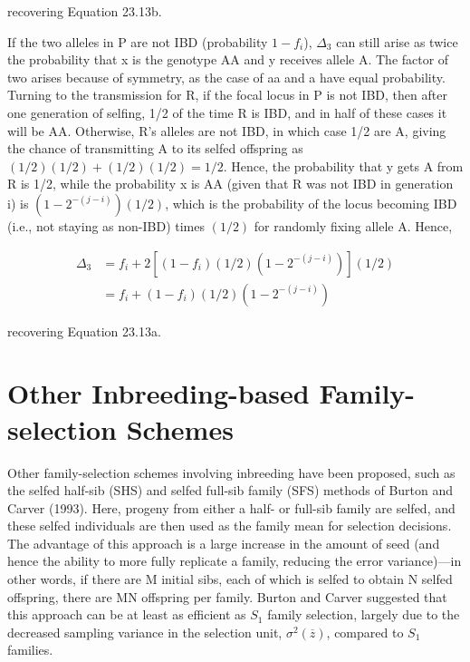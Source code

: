 \documentclass{article}
\begin{document}
recovering Equation 23.13b.

If the two alleles in P are not IBD (probability  $ 1 - f_i $),  $ \Delta_3 $ can still arise as twice the probability that x is the genotype AA and y receives allele A. The factor of two arises because of symmetry, as the case of aa and a have equal probability. Turning to the transmission for R, if the focal locus in P is not IBD, then after one generation of selfing, 1/2 of the time R is IBD, and in half of these cases it will be AA. Otherwise, R's alleles are not IBD, in which case 1/2 are A, giving the chance of transmitting A to its selfed offspring as  $ (1/2)(1/2) + (1/2)(1/2) = 1/2 $. Hence, the probability that y gets A from R is 1/2, while the probability x is AA (given that R was not IBD in generation i) is  $ (1 - 2^{-(j-i)})(1/2) $, which is the probability of the locus becoming IBD (i.e., not staying as non-IBD) times  $ (1/2) $ for randomly fixing allele A. Hence,

\begin{equation}
\begin{aligned}\Delta_{3}&=f_{i}+2\left[(1-f_{i})(1/2)(1-2^{-(j-i)})\right](1/2)\\&=f_{i}+(1-f_{i})(1/2)(1-2^{-(j-i)})\end{aligned}
\end{equation}

recovering Equation 23.13a.

\section{Other Inbreeding-based Family-selection Schemes}
Other family-selection schemes involving inbreeding have been proposed, such as the selfed half-sib (SHS) and selfed full-sib family (SFS) methods of Burton and Carver (1993). Here, progeny from either a half- or full-sib family are selfed, and these selfed individuals are then used as the family mean for selection decisions. The advantage of this approach is a large increase in the amount of seed (and hence the ability to more fully replicate a family, reducing the error variance)—in other words, if there are M initial sibs, each of which is selfed to obtain N selfed offspring, there are MN offspring per family. Burton and Carver suggested that this approach can be at least as efficient as  $ S_1 $ family selection, largely due to the decreased sampling variance in the selection unit,  $ \sigma^2(\overline{z}) $, compared to  $ S_1 $ families.
\end{document}
